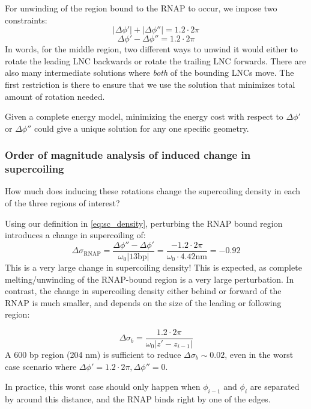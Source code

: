 \documentclass[11pt]{article}
\begin{document}
For unwinding of the region bound to the RNAP to occur, we impose two constraints:
\begin{equation}
    |\Delta \phi'| + |\Delta \phi''| = 1.2 \cdot 2 \pi
\end{equation}
\begin{equation}
    \Delta \phi' - \Delta \phi'' = 1.2 \cdot 2\pi
\end{equation}
In words, for the middle region, two different ways to unwind it would either to rotate the leading LNC backwards or rotate the trailing LNC forwards. There are also many intermediate solutions where \emph{both} of the bounding LNCs move. The first restriction is there to ensure that we use the solution that minimizes total amount of rotation needed.

Given a complete energy model, minimizing the energy cost with respect to \(\Delta \phi'\) or \(\Delta \phi''\) could give a unique solution for any one specific geometry.

\subsubsection{Order of magnitude analysis of induced change in supercoiling}
How much does inducing these rotations change the supercoiling density in each of the three regions of interest?

Using our definition in \autoref{eq:sc_density}, perturbing the RNAP bound region introduces a change in supercoiling of:
\begin{equation}
    \Delta \sigma_\text{RNAP} = \frac{\Delta \phi'' - \Delta \phi'}{\omega_0 |13 \text{bp}|} = \frac{-1.2 \cdot 2\pi}{\omega_0 \cdot 4.42 \text{nm}} = -0.92
    \label{eq:delta_sigma_rnap}
\end{equation}
This is a very large change in supercoiling density! This is expected, as complete melting/unwinding of the RNAP-bound region is a very large perturbation. In contrast, the change in supercoiling density either behind or forward of the RNAP is much smaller, and depends on the size of the leading or following region:

\begin{equation}
\Delta \sigma_b = \frac{1.2 \cdot 2 \pi}{\omega_0 |z' - z_{i-1}|}
\end{equation}
A 600 bp region (204 nm) is sufficient to reduce \(\Delta \sigma_b \sim 0.02\), even in the worst case scenario where \(\Delta \phi' = 1.2 \cdot 2  \pi, \Delta \phi'' = 0\).

In practice, this worst case should only happen when \(\phi_{i-1}\) and \(\phi_i\) are separated by around this distance, and the RNAP binds right by one of the edges.
\end{document}
